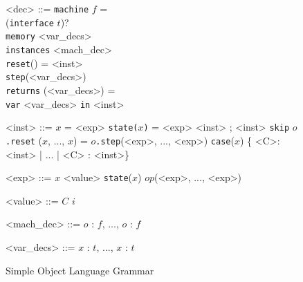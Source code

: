 \begin{figure}[h]
\begin{grammar}
<dec> ::= \verb|machine| $f$ = \\
(\verb|interface| $t$)? \\
\verb|memory| <var_decs> \\
\verb|instances| <mach_dec> \\
\verb|reset|() = <inst> \\
\verb|step|(<var_decs>) \\
\verb|returns| (<var_decs>) = \\
\verb|var| <var_decs> \verb|in| <inst>

<inst> ::= $x$ = <exp>
\alt \verb|state(|$x$\verb|)| = <exp>
\alt <inst> ; <inst>
\alt \verb|skip|
\alt $o$\verb|.reset|
\alt ($x$, ..., $x$) = $o$\verb|.step|(<exp>, ..., <exp>)
\alt \verb|case|($x$) \{ <C>: <inst> | ... | <C> : <inst>\}

<exp> ::= $x$
\alt <value>
\alt \verb|state|($x$)
\alt $op$(<exp>, ..., <exp>)

<value> ::= $C$ \alt $i$

<mach_dec> ::= $o$ : $f$, ..., $o$ : $f$

<var_decs> ::= $x$ : $t$, ..., $x$ : $t$

\end{grammar}
\hrulefill
\caption{Simple Object Language Grammar}
\end{figure}